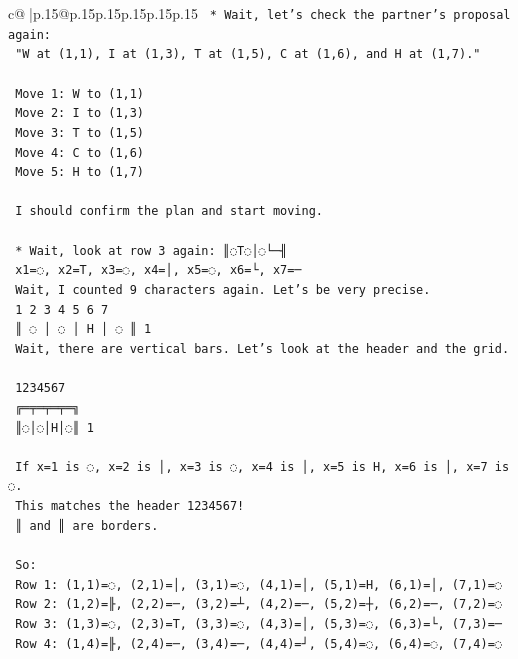 \documentclass{article}
\begin{document}
{\begin{supertabular}{c@{$\;$}|p{.15\linewidth}@{}p{.15\linewidth}p{.15\linewidth}p{.15\linewidth}p{.15\linewidth}p{.15\linewidth}}
{{{\texttt{    *   Wait, let's check the partner's proposal again:} \\
\texttt{        "W at (1,1), I at (1,3), T at (1,5), C at (1,6), and H at (1,7)."} \\
\\ 
\texttt{        Move 1: W to (1,1)} \\
\texttt{        Move 2: I to (1,3)} \\
\texttt{        Move 3: T to (1,5)} \\
\texttt{        Move 4: C to (1,6)} \\
\texttt{        Move 5: H to (1,7)} \\
\\ 
\texttt{        I should confirm the plan and start moving.} \\
\\ 
\texttt{    *   Wait, look at row 3 again: ║◌T◌│◌└─╢} \\
\texttt{        x1=◌, x2=T, x3=◌, x4=│, x5=◌, x6=└, x7=─} \\
\texttt{        Wait, I counted 9 characters again. Let's be very precise.} \\
\texttt{        1 2 3 4 5 6 7} \\
\texttt{        ║ ◌ │ ◌ │ H │ ◌ ║ 1} \\
\texttt{        Wait, there are vertical bars. Let's look at the header and the grid.} \\
\\ 
\texttt{         1234567} \\
\texttt{        ╔═╤═╤═╤═╗} \\
\texttt{        ║◌│◌│H│◌║ 1} \\
\\ 
\texttt{        If x=1 is ◌, x=2 is │, x=3 is ◌, x=4 is │, x=5 is H, x=6 is │, x=7 is ◌.} \\
\texttt{        This matches the header 1234567!} \\
\texttt{        ║ and ║ are borders.} \\
\\ 
\texttt{        So:} \\
\texttt{        Row 1: (1,1)=◌, (2,1)=│, (3,1)=◌, (4,1)=│, (5,1)=H, (6,1)=│, (7,1)=◌} \\
\texttt{        Row 2: (1,2)=╟, (2,2)=─, (3,2)=┴, (4,2)=─, (5,2)=┼, (6,2)=─, (7,2)=◌} \\
\texttt{        Row 3: (1,3)=◌, (2,3)=T, (3,3)=◌, (4,3)=│, (5,3)=◌, (6,3)=└, (7,3)=─} \\
\texttt{        Row 4: (1,4)=╟, (2,4)=─, (3,4)=─, (4,4)=┘, (5,4)=◌, (6,4)=◌, (7,4)=◌} \\
}}}
\end{supertabular}}
\end{document}
